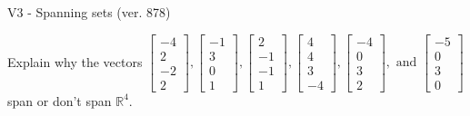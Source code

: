 \begin{exercise}
  \begin{exerciseTitle}V3 - Spanning sets (ver. 878)\end{exerciseTitle}
  \begin{exerciseStatement}
    Explain why the vectors \(\left[\begin{array}{r}
-4 \\
2 \\
-2 \\
2
\end{array}\right] , \left[\begin{array}{r}
-1 \\
3 \\
0 \\
1
\end{array}\right] , \left[\begin{array}{r}
2 \\
-1 \\
-1 \\
1
\end{array}\right] , \left[\begin{array}{r}
4 \\
4 \\
3 \\
-4
\end{array}\right] , \left[\begin{array}{r}
-4 \\
0 \\
3 \\
2
\end{array}\right] , \text{ and } \left[\begin{array}{r}
-5 \\
0 \\
3 \\
0
\end{array}\right]\) span or don't span \(\mathbb{R}^4\). 
	



\end{exerciseStatement}
\end{exercise}
